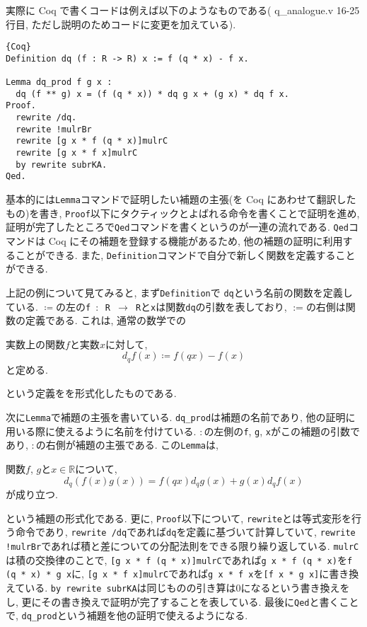 \documentclass[11pt]{jsreport}
\theoremstyle{mystyle}
\newcommand{\R}{\mathbb{R}}
\newcommand{\0}{\textbf{0}}
\begin{document}
実際に Coq で書くコードは例えば以下のようなものである(\cite{coq qana} q\_analogue.v 16-25行目, ただし説明のためコードに変更を加えている).
\begin{lstlisting}{Coq}
Definition dq (f : R -> R) x := f (q * x) - f x.

Lemma dq_prod f g x :
  dq (f ** g) x = (f (q * x)) * dq g x + (g x) * dq f x.
Proof.
  rewrite /dq.
  rewrite !mulrBr 
  rewrite [g x * f (q * x)]mulrC
  rewrite [g x * f x]mulrC
  by rewrite subrKA.
Qed. \end{lstlisting}
基本的には{\tt Lemma}コマンドで証明したい補題の主張(を Coq にあわせて翻訳したもの)を書き, {\tt Proof}以下にタクティックとよばれる命令を書くことで証明を進め, 証明が完了したところで{\tt Qed}コマンドを書くというのが一連の流れである. {\tt Qed}コマンドは Coq にその補題を登録する機能があるため, 他の補題の証明に利用することができる. また, {\tt Definition}コマンドで自分で新しく関数を定義することができる. 

上記の例について見てみると,  
まず{\tt Definition}で {\tt dq}という名前の関数を定義している. {\tt $\coloneqq$}の左の{\tt f $\colon$ R $\to$ R}と{\tt x}は関数{\tt dq}の引数を表しており, $:=$の右側は関数の定義である. 
これは, 通常の数学での
\begin{screen}
実数上の関数$f$と実数$x$に対して, 
\[
  d_q f (x) \coloneqq f(qx) - f(x)
\]
と定める. 
\end{screen}
という定義をを形式化したものである. 

次に{\tt Lemma}で補題の主張を書いている. {\tt dq\_prod}は補題の名前であり, 他の証明に用いる際に使えるように名前を付けている. {\tt $\colon$}の左側の{\tt f}, {\tt g}, {\tt x}がこの補題の引数であり, {\tt $\colon$}の右側が補題の主張である. この{\tt Lemma}は, 
\begin{screen}
関数$f$, $g$と$x \in \R$について, 
\[
  d_q (f(x)g(x)) = f(qx)d_qg(x) + g(x)d_qf(x)
\]
が成り立つ.
\end{screen}
という補題の形式化である. 
更に, {\tt Proof}以下について, {\tt rewrite}とは等式変形を行う命令であり, {\tt rewrite /dq}であれば{\tt dq}を定義に基づいて計算していて, {\tt rewrite !mulrBr}であれば積と差についての分配法則をできる限り繰り返している. {\tt mulrC}は積の交換律のことで, 
{\tt [g x * f (q * x)]mulrC}であれば{\tt g x * f (q * x)}を{\tt f (q * x) * g x}に, 
{\tt [g x * f  x]mulrC}であれば{\tt g x * f x}を{\tt [f x * g x]}に書き換えている. 
{\tt by rewrite subrKA}は同じものの引き算は$0$になるという書き換えをし, 更にその書き換えで証明が完了することを表している. 
最後に{\tt Qed}と書くことで, {\tt dq\_prod}という補題を他の証明で使えるようになる. 
\end{document}
